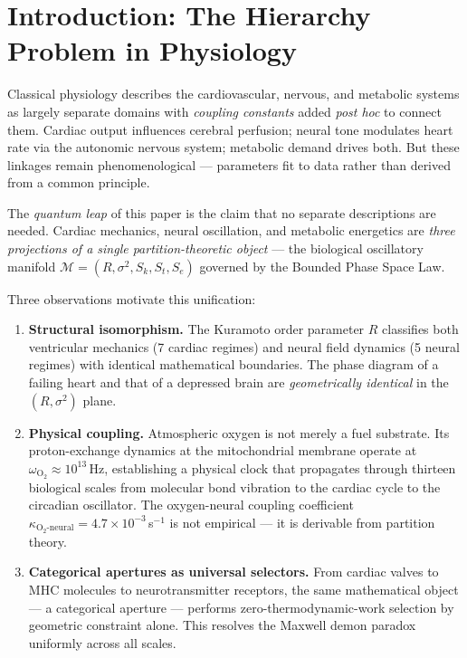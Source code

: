 \documentclass[12pt,a4paper]{article}
\theoremstyle{definition}
\newcommand{\calM}{\mathcal{M}}
\begin{document}
\newpage

\section{Introduction: The Hierarchy Problem in Physiology}

Classical physiology describes the cardiovascular, nervous, and metabolic systems
as largely separate domains with \emph{coupling constants} added \emph{post hoc}
to connect them. Cardiac output influences cerebral perfusion; neural tone modulates
heart rate via the autonomic nervous system; metabolic demand drives both. But these
linkages remain phenomenological — parameters fit to data rather than derived from
a common principle.

The \emph{quantum leap} of this paper is the claim that no separate descriptions
are needed. Cardiac mechanics, neural oscillation, and metabolic energetics are
\emph{three projections of a single partition-theoretic object} — the biological
oscillatory manifold $\calM = (R, \sigma^2, S_k, S_t, S_e)$ governed by the
Bounded Phase Space Law.

Three observations motivate this unification:

\begin{enumerate}
\item \textbf{Structural isomorphism.} The Kuramoto order parameter $R$ classifies
both ventricular mechanics (7 cardiac regimes) and neural field dynamics (5 neural
regimes) with identical mathematical boundaries. The phase diagram of a failing
heart and that of a depressed brain are \emph{geometrically identical} in the
$(R, \sigma^2)$ plane.

\item \textbf{Physical coupling.} Atmospheric oxygen is not merely a fuel substrate.
Its proton-exchange dynamics at the mitochondrial membrane operate at
$\omega_{\text{O}_2} \approx 10^{13}$\,Hz, establishing a physical clock that
propagates through thirteen biological scales from molecular bond vibration to
the cardiac cycle to the circadian oscillator. The oxygen-neural coupling
coefficient $\kappa_{\text{O}_2\text{-neural}} = 4.7 \times 10^{-3}$\,s$^{-1}$
is not empirical — it is derivable from partition theory.

\item \textbf{Categorical apertures as universal selectors.} From cardiac valves to
MHC molecules to neurotransmitter receptors, the same mathematical object —
a categorical aperture — performs zero-thermodynamic-work selection by geometric
constraint alone. This resolves the Maxwell demon paradox uniformly across all scales.
\end{enumerate}
\end{document}
